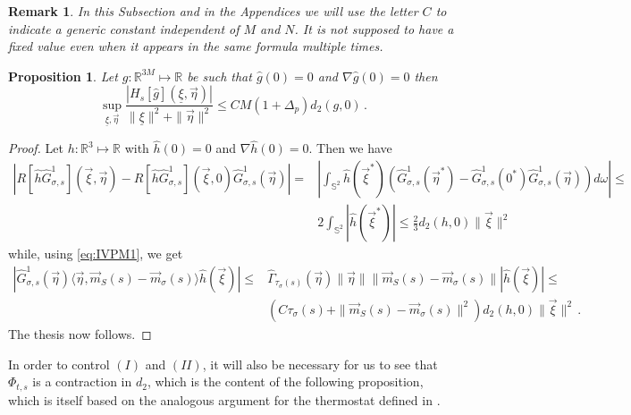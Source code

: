 \documentclass{article}
\newcommand*\R{ \mathds{R} }
\newcommand\uxi{{\underline \xi}}
\newcommand\vxi{{\vec \xi}}
\newcommand\veta{{\vec \eta}}
\newtheorem{Prop}{Proposition}
\newtheorem{Remark}{Remark}
\begin{document}
\begin{Remark}
\emph{In this Subsection and in the Appendices we will use the letter $C$ to indicate a generic constant independent of
$M$ and $N$. It is not supposed to have a fixed value even when it appears in the same formula multiple times.
}
\end{Remark}

\begin{Prop}\label{Prop:H}
Let $g:\R^{3M}\mapsto \R$ be such that $\hat 
g(0)=0$ and $\nabla \hat g(0)=0$ then
\begin{equation*}
\sup_{\uxi,\veta} \frac{|H_s[\hat g](\uxi,\veta)|}{\|\uxi\|^2+\|\veta\|^2}\leq CM(1+\Delta_p)d_2(g,0)\, .
\end{equation*}
\end{Prop}

\begin{proof}Let $h:\R^3\mapsto \R$ with $\hat 
h(0)=0$ and $\nabla \hat h(0)=0$. Then we have
\[
\begin{aligned}
\left|R[\hat h\widehat G^1_{\sigma,s}](\vxi,\veta)-R[\hat h\widehat G^1_{\sigma,s}](\vxi,0)\widehat 
G^1_{\sigma,s}(\veta)\right|=&
\left|\int_{\mathds S^2} \hat h(\vxi^*)\left(\widehat G^1_{\sigma,s}(\veta^*)-
\widehat G^1_{\sigma,s}(0^*)\widehat G^1_{\sigma,s}(\veta)\right)d\omega\right|\leq \\
&2 \int_{\mathds S^2}|\hat h(\vxi^*)|\leq \frac 23 d_2(h,0)\|\vxi\|^2
\end{aligned}
\]
while, using \eqref{eq:IVPM1}, we get
\[
\begin{aligned}
|\widehat G^1_{\sigma,s}(\veta)\langle \veta,\vec m_S(s)-\vec m_\sigma(s)\rangle \hat h(\vxi)|
\leq &
\widehat \Gamma_{\tau_\sigma(s)}(\veta)\|\veta\|\|\vec m_S(s)-\vec m_\sigma(s)\||\hat h(\vxi)|\leq \\
&(C\tau_\sigma(s)+\|\vec m_S(s)-\vec m_\sigma(s)\|^2)d_2(h,0)\|\vxi\|^2\, .
\end{aligned}
\]
The thesis now follows.

\end{proof}

In order to control $(I)$ and $(II)$, it will also be necessary for us to see that $\Phi_{t,s}$ is a contraction in 
$d_2$, which is the content of the following proposition, which is itself based on the analogous argument for the 
thermostat defined in \cite{BLP25}.
\end{document}
